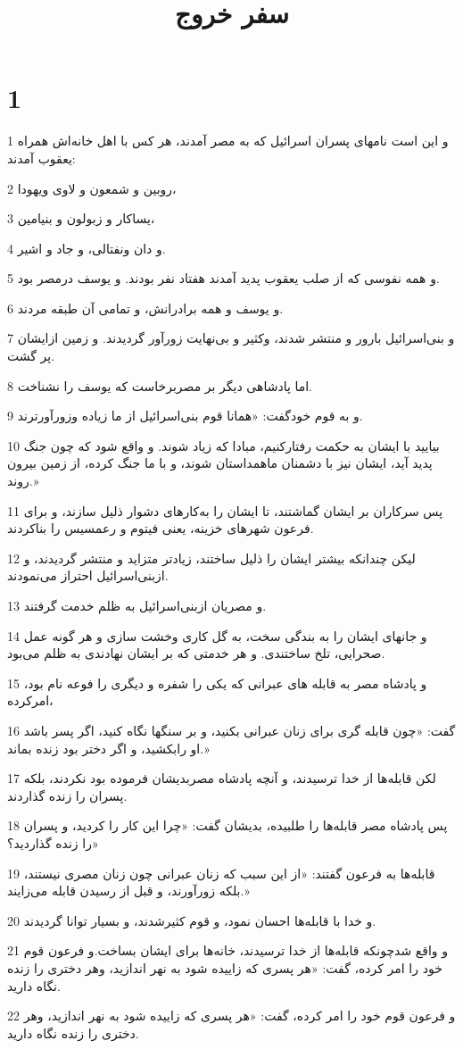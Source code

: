 

\title{سفر خروج}

 
\chapter{1}

\par 1 و این است نامهای پسران اسرائیل که به مصر آمدند، هر کس با اهل خانه‌اش همراه یعقوب آمدند:
\par 2 روبین و شمعون و لاوی ویهودا،
\par 3 یساکار و زبولون و بنیامین،
\par 4 و دان ونفتالی، و جاد و اشیر.
\par 5 و همه نفوسی که از صلب یعقوب پدید آمدند هفتاد نفر بودند. و یوسف درمصر بود.
\par 6 و یوسف و همه برادرانش، و تمامی آن طبقه مردند.
\par 7 و بنی‌اسرائیل بارور و منتشر شدند، وکثیر و بی‌نهایت زورآور گردیدند. و زمین ازایشان پر گشت.
\par 8 اما پادشاهی دیگر بر مصربرخاست که یوسف را نشناخت.
\par 9 و به قوم خودگفت: «همانا قوم بنی‌اسرائیل از ما زیاده وزورآورترند.
\par 10 بیایید با ایشان به حکمت رفتارکنیم، مبادا که زیاد شوند. و واقع شود که چون جنگ پدید آید، ایشان نیز با دشمنان ماهمداستان شوند، و با ما جنگ کرده، از زمین بیرون روند.»
\par 11 پس سرکاران بر ایشان گماشتند، تا ایشان را به‌کارهای دشوار ذلیل سازند، و برای فرعون شهرهای خزینه، یعنی فیتوم و رعمسیس را بناکردند.
\par 12 لیکن چندانکه بیشتر ایشان را ذلیل ساختند، زیادتر متزاید و منتشر گردیدند، و ازبنی‌اسرائیل احتراز می‌نمودند.
\par 13 و مصریان ازبنی‌اسرائیل به ظلم خدمت گرفتند.
\par 14 و جانهای ایشان را به بندگی سخت، به گل کاری وخشت سازی و هر گونه عمل صحرایی، تلخ ساختندی. و هر خدمتی که بر ایشان نهادندی به ظلم می‌بود.
\par 15 و پادشاه مصر به قابله های عبرانی که یکی را شفره و دیگری را فوعه نام بود، امرکرده،
\par 16 گفت: «چون قابله گری برای زنان عبرانی بکنید، و بر سنگها نگاه کنید، اگر پسر باشد او رابکشید، و اگر دختر بود زنده بماند.»
\par 17 لکن قابله‌ها از خدا ترسیدند، و آنچه پادشاه مصربدیشان فرموده بود نکردند، بلکه پسران را زنده گذاردند.
\par 18 پس پادشاه مصر قابله‌ها را طلبیده، بدیشان گفت: «چرا این کار را کردید، و پسران را زنده گذاردید؟»
\par 19 قابله‌ها به فرعون گفتند: «از این سبب که زنان عبرانی چون زنان مصری نیستند، بلکه زورآورند، و قبل از رسیدن قابله می‌زایند.»
\par 20 و خدا با قابله‌ها احسان نمود، و قوم کثیرشدند، و بسیار توانا گردیدند.
\par 21 و واقع شدچونکه قابله‌ها از خدا ترسیدند، خانه‌ها برای ایشان بساخت.و فرعون قوم خود را امر کرده، گفت: «هر پسری که زاییده شود به نهر اندازید، وهر دختری را زنده نگاه دارید.
\par 22 و فرعون قوم خود را امر کرده، گفت: «هر پسری که زاییده شود به نهر اندازید، وهر دختری را زنده نگاه دارید.
 
